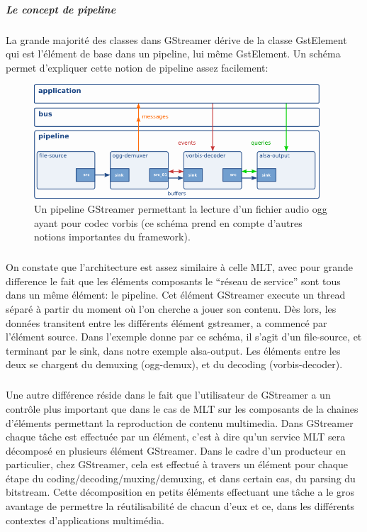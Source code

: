 \subparagraph{Le concept de pipeline}

\subparagraph{}

La grande majorité des classes dans GStreamer dérive de la classe
GstElement qui est l'élément de base dans un pipeline, lui même
GstElement. Un schéma permet d'expliquer cette notion de pipeline
assez facilement:

\begin{figure} [H]

  \begin{center}

    \includegraphics[width=0.95\textwidth]{images/gstpipeline}

  \end{center}

  \caption{Un pipeline GStreamer permettant la lecture d'un fichier
  audio ogg
    ayant pour codec vorbis (ce schéma prend en compte d'autres notions
    importantes du framework).}

  \label{Yes}

\end{figure}

\subparagraph{}

On constate que l'architecture est assez similaire à celle
MLT, avec pour grande difference le fait que les éléments
composants le ``réseau de service'' sont tous dans un même élément:
le pipeline. Cet élément GStreamer execute un thread séparé à
partir du moment où l'on cherche a jouer son contenu. Dès lors,
les données transitent entre les différents élément gstreamer, a
commencé par l'élément source. Dans l'exemple donne par ce schéma,
il s'agit d'un file-source, et terminant par le sink, dans notre exemple
alsa-output. Les éléments entre les deux se chargent du demuxing
(ogg-demux), et du decoding (vorbis-decoder).

\subparagraph{}

Une autre différence réside dans le fait que l'utilisateur de GStreamer
a un contrôle plus important que dans le cas de MLT sur
les composants de la chaines d'éléments permettant la reproduction de
contenu multimedia.  Dans GStreamer chaque tâche est effectuée par un
élément, c'est à dire qu'un service MLT sera décomposé
en plusieurs élément GStreamer. Dans le cadre d'un producteur en
particulier, chez GStreamer, cela est effectué à travers un élément
pour chaque étape du coding/decoding/muxing/demuxing, et dans certain
cas, du parsing du bitstream. Cette décomposition en petits éléments
effectuant une tâche a le gros avantage de permettre la réutilisabilité
de chacun d'eux et ce, dans les différents  contextes d'applications
multimédia.

